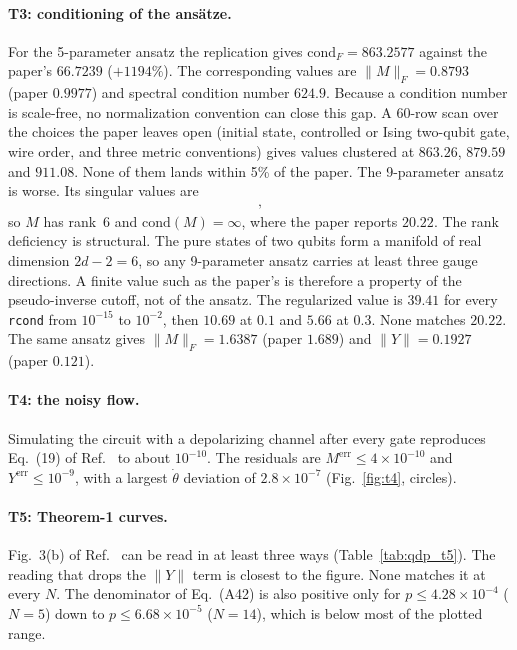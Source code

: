 \documentclass[aps,pra,reprint,superscriptaddress,nofootinbib]{revtex4-2}
\newcommand{\thetadot}{\dot\theta}
\newcommand{\cond}{\mathrm{cond}}
\newcommand{\rcond}{\texttt{rcond}}
\begin{document}
\paragraph*{T3: conditioning of the ansätze.} For the 5-parameter ansatz the replication gives
$\cond_F=863.2577$ against the paper's $66.7239$ ($+1194\%$). The corresponding values are
$\|M\|_F=0.8793$ (paper $0.9977$) and spectral condition number $624.9$. Because a condition number is scale-free, no normalization convention can close this gap. A
60-row scan over the choices the paper leaves open (initial state, controlled or Ising
two-qubit gate, wire order, and three metric conventions) gives values clustered at
$863.26$, $879.59$ and $911.08$. None of them lands within 5\% of the paper. The 9-parameter
ansatz is worse. Its singular values are
\begin{multline*}
[1.267,\,0.706,\,0.633,\,0.383,\,0.181,\,0.0432,\\
8.8{\times}10^{-17},\,2.9{\times}10^{-17},\,3.2{\times}10^{-18}],
\end{multline*}
so $M$ has rank~6 and $\cond(M)=\infty$, where the paper reports $20.22$. The rank deficiency is
structural. The pure states of two qubits form a manifold of real dimension $2d-2=6$, so any
9-parameter ansatz carries at least three gauge directions. A finite value such as the
paper's is therefore a property of the pseudo-inverse cutoff, not of the ansatz. The
regularized value is $39.41$ for every \rcond{} from $10^{-15}$ to $10^{-2}$, then $10.69$ at
$0.1$ and $5.66$ at $0.3$. None matches $20.22$. The same ansatz gives $\|M\|_F=1.6387$
(paper $1.689$) and $\|Y\|=0.1927$ (paper $0.121$).

\paragraph*{T4: the noisy flow.} Simulating the circuit with a depolarizing channel after every
gate reproduces Eq.~(19) of Ref.~\cite{QDP2024} to about $10^{-10}$. The residuals are
$M^{\mathrm{err}}\le4\times10^{-10}$ and $Y^{\mathrm{err}}\le10^{-9}$, with a largest
$\thetadot$ deviation of $2.8\times10^{-7}$ (Fig.~\ref{fig:t4}, circles).

\paragraph*{T5: Theorem-1 curves.} Fig.~3(b) of Ref.~\cite{QDP2024} can be read in at least
three ways (Table~\ref{tab:qdp_t5}). The reading that drops the $\|Y\|$ term is closest to the
figure. None matches it at every $N$. The denominator of Eq.~(A42) is also positive only for
$p\le4.28\times10^{-4}$ ($N=5$) down to $p\le6.68\times10^{-5}$ ($N=14$), which is below most
of the plotted range.
\end{document}
